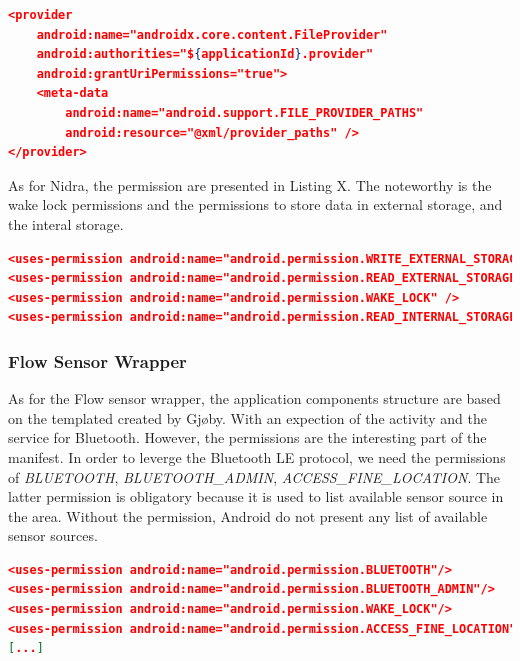\begin{lstlisting}[language=json, caption={My Caption}, captionpos=b]
<provider
    android:name="androidx.core.content.FileProvider"
    android:authorities="${applicationId}.provider"
    android:grantUriPermissions="true">
    <meta-data
        android:name="android.support.FILE_PROVIDER_PATHS"
        android:resource="@xml/provider_paths" />
</provider>
\end{lstlisting}

As for Nidra, the permission are presented in Listing X. The noteworthy is the wake lock permissions and the permissions to store data in external storage, and the interal storage. 

\begin{lstlisting}[language=json, caption={My Caption}, captionpos=b]
<uses-permission android:name="android.permission.WRITE_EXTERNAL_STORAGE" />
<uses-permission android:name="android.permission.READ_EXTERNAL_STORAGE" />
<uses-permission android:name="android.permission.WAKE_LOCK" />
<uses-permission android:name="android.permission.READ_INTERNAL_STORAGE" />
\end{lstlisting}

\subsubsection{Flow Sensor Wrapper}

As for the Flow sensor wrapper, the application components structure are based on the templated created by Gjøby. With an expection of the activity and the service for Bluetooth. However, the permissions are the interesting part of the manifest. In order to leverge the Bluetooth LE protocol, we need the permissions of \textit{BLUETOOTH}, \textit{BLUETOOTH\_ADMIN}, \textit{ACCESS\_FINE\_LOCATION}. The latter permission is obligatory because it is used to list available sensor source in the area. Without the permission, Android do not present any list of available sensor sources. 

\begin{lstlisting}[language=json, caption={My Caption}, captionpos=b]
<uses-permission android:name="android.permission.BLUETOOTH"/>
<uses-permission android:name="android.permission.BLUETOOTH_ADMIN"/>
<uses-permission android:name="android.permission.WAKE_LOCK"/>
<uses-permission android:name="android.permission.ACCESS_FINE_LOCATION"/>
[...]
\end{lstlisting}


